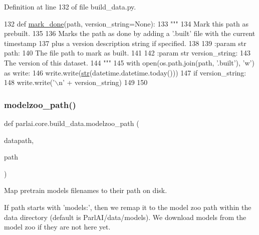 Definition at line 132 of file build\+\_\+data.\+py.


\begin{DoxyCode}
132 \textcolor{keyword}{def }\hyperlink{namespaceparlai_1_1core_1_1build__data_a2527e6d29b0ccb7b841182890ac36a59}{mark\_done}(path, version\_string=None):
133     \textcolor{stringliteral}{"""}
134 \textcolor{stringliteral}{    Mark this path as prebuilt.}
135 \textcolor{stringliteral}{}
136 \textcolor{stringliteral}{    Marks the path as done by adding a '.built' file with the current timestamp}
137 \textcolor{stringliteral}{    plus a version description string if specified.}
138 \textcolor{stringliteral}{}
139 \textcolor{stringliteral}{    :param str path:}
140 \textcolor{stringliteral}{        The file path to mark as built.}
141 \textcolor{stringliteral}{}
142 \textcolor{stringliteral}{    :param str version\_string:}
143 \textcolor{stringliteral}{        The version of this dataset.}
144 \textcolor{stringliteral}{    """}
145     with open(os.path.join(path, \textcolor{stringliteral}{'.built'}), \textcolor{stringliteral}{'w'}) \textcolor{keyword}{as} write:
146         write.write(\hyperlink{namespacegenerate__task__READMEs_a5b88452ffb87b78c8c85ececebafc09f}{str}(datetime.datetime.today()))
147         \textcolor{keywordflow}{if} version\_string:
148             write.write(\textcolor{stringliteral}{'\(\backslash\)n'} + version\_string)
149 
150 
\end{DoxyCode}
\mbox{\label{namespaceparlai_1_1core_1_1build__data_ad06e9e38ca85db9c4a676ccd9ae41649}} 
\subsubsection{\texorpdfstring{modelzoo\+\_\+path()}{modelzoo\_path()}}
{\footnotesize\ttfamily def parlai.\+core.\+build\+\_\+data.\+modelzoo\+\_\+path (\begin{DoxyParamCaption}\item[{}]{datapath,  }\item[{}]{path }\end{DoxyParamCaption})}

\begin{DoxyVerb}Map pretrain models filenames to their path on disk.

If path starts with 'models:', then we remap it to the model zoo path within the
data directory (default is ParlAI/data/models). We download models from the model
zoo if they are not here yet.
\end{DoxyVerb}
 

